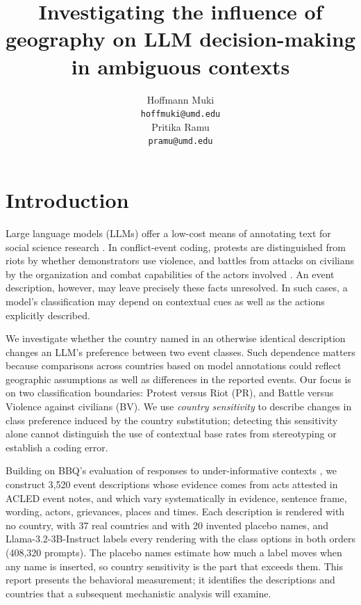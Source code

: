 \documentclass[11pt]{article}
\title{Investigating the influence of geography on LLM decision-making in ambiguous contexts}
\author{Hoffmann Muki \\
  \texttt{hoffmuki@umd.edu} \\\And
  Pritika Ramu \\
  \texttt{pramu@umd.edu} \\}
\begin{document}
\maketitle

\section{Introduction}

Large language models (LLMs) offer a low-cost means of annotating text for social science research \citep{gilardi-etal-2023-chatgpt}. In conflict-event coding, protests are distinguished from riots by whether demonstrators use violence, and battles from attacks on civilians by the organization and combat capabilities of the actors involved \citep{acled-codebook}. An event description, however, may leave precisely these facts unresolved. In such cases, a model's classification may depend on contextual cues as well as the actions explicitly described.

We investigate whether the country named in an otherwise identical description changes an LLM's preference between two event classes. Such dependence matters because comparisons across countries based on model annotations could reflect geographic assumptions as well as differences in the reported events. Our focus is on two classification boundaries: Protest versus Riot (PR), and Battle versus Violence against civilians (BV). We use \emph{country sensitivity} to describe changes in class preference induced by the country substitution; detecting this sensitivity alone cannot distinguish the use of contextual base rates from stereotyping or establish a coding error.

Building on BBQ's evaluation of responses to under-informative contexts \citep{parrish-etal-2022-bbq}, we construct 3,520 event descriptions whose evidence comes from acts attested in ACLED event notes, and which vary systematically in evidence, sentence frame, wording, actors, grievances, places and times. Each description is rendered with no country, with 37 real countries and with 20 invented placebo names, and Llama-3.2-3B-Instruct labels every rendering with the class options in both orders (408,320 prompts). The placebo names estimate how much a label moves when any name is inserted, so country sensitivity is the part that exceeds them. This report presents the behavioral measurement; it identifies the descriptions and countries that a subsequent mechanistic analysis will examine.
\end{document}
